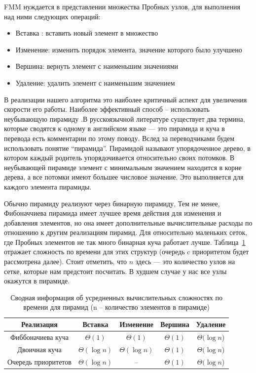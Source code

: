 FMM нуждается в представлении множества Пробных узлов, для
выполнения над ними следующих операций:
\begin{itemize}
\item Вставка : вставить новый элемент в множество
\item Изменение: изменить порядок элемента, значение которого было
  улучшено
\item Вершина: вернуть элемент с наименьшим значениями
\item Удаление: удалить элемент с наименьшим значением 
\end{itemize}
В реализации нашего алгоритма это наиболее критичный аспект для
увеличения скорости его работы. Наиболее эффективный способ --
использовать неубывающую пирамиду \cite{K2017}.В русскоязычной
литературе существует два термина, которые сводятся к одному в
английском языке --- это пирамида и куча в перевода \cite{K2017} есть
комментарии по этому поводу. Вслед за переводчиками будем использовать
понятие ``пирамида''. Пирамидой называют упорядоченное дерево, в
котором каждый родитель упорядочивается относительно своих потомков. В
неубывающей пирамиде элемент с минимальным значением находится в корне
дерева, а все потомки имеют большее числовое значение. Это выполняется
для каждого элемента пирамиды.

Обычно пирамиду реализуют через бинарную пирамиду, Тем не менее,
Фибоначчиева пирамида \cite{F1987} имеет лучшее время действия для
изменения и добавления элементов, но она имеет дополнительные
вычислительные расходы по отношению к другим реализациям пирамид. Для
относительно маленьких сеток, где Пробных элементов не так много
бинарная куча работает лучше. Таблица~\ref{tab:perf} отражает
сложность по времени для этих структур (очередь c приоритетом будет
рассмотрена далее). Стоит отметить, что $n$ здесь --- это количество
узлов на сетке, которые нам предстоит посчитать. В худшем случае у нас
все узлы окажутся в пирамиде.

\begin{table}
  \centering
  \caption{Сводная информация об усредненных вычислительных
    сложностях по времени для пирамид (n -- количество элементов в
    пирамиде)}
  \label{tab:perf}
  \begin{tabular}{|*{5}{c|}}
    \hline
Реализация & Вставка & Изменение & Вершина & Удаление\\[0.3cm]\hline
Фиббоначиева куча & $\Theta(1)$ & $\Theta(1)$&$\Theta(1)$&$\Theta(\log n$) \\\hline
Двоичная куча & $\Theta(\log n)$ & $\Theta(\log n)$&$\Theta(1)$&$\Theta(\log n$) \\\hline
Очередь приоритетов & $\Theta(\log n)$ & -- &$\Theta(1)$&$\Theta(\log n$) \\\hline
    
  \end{tabular}
\end{table}

